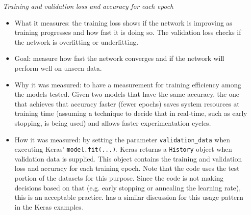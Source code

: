 \documentclass[../CAP6619_term_project_cgarbin.tex]{subfiles}
\begin{document}
\smallskip
\textit{Training and validation loss and accuracy for each epoch}
\begin{itemize}
\item What it measures: the training loss shows if the network is improving as training progresses and how fast it is doing so. The validation loss checks if the network is overfitting or underfitting.
\item Goal: measure how fast the network converges and if the network will perform well on unseen data.
\item Why it was measured: to have a measurement for training efficiency among the models tested. Given two models that have the same accuracy, the one that achieves that accuracy faster (fewer epochs) saves system resources at training time (assuming a technique to decide that in real-time, such as early stopping, is being used) and allows faster experimentation cycles.
\item How it was measured: by setting the parameter \verb|validation_data| when executing Keras' \verb|model.fit(...)|. Keras returns a \verb|History| object when validation data is supplied. This object contains the training and validation loss and accuracy for each training epoch. Note that the code uses the test portion of the datasets for this purpose. Since the code is not making decisions based on that (e.g. early stopping \cite{Morgan1989} or annealing the learning rate), this is an acceptable practice. \cite{KerasTeam2016} has a similar discussion for this usage pattern in the Keras examples.
\end{itemize}
\end{document}
